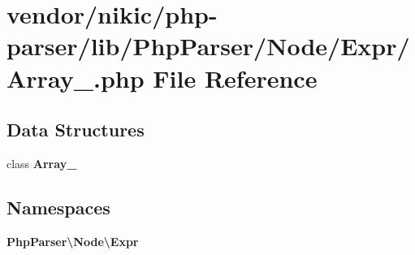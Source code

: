 \section{vendor/nikic/php-\/parser/lib/\+Php\+Parser/\+Node/\+Expr/\+Array\+\_\+.php File Reference}
\label{_array___8php}
\subsection*{Data Structures}
\begin{DoxyCompactItemize}
\item 
class {\bf Array\+\_\+}
\end{DoxyCompactItemize}
\subsection*{Namespaces}
\begin{DoxyCompactItemize}
\item 
 {\bf Php\+Parser\textbackslash{}\+Node\textbackslash{}\+Expr}
\end{DoxyCompactItemize}
